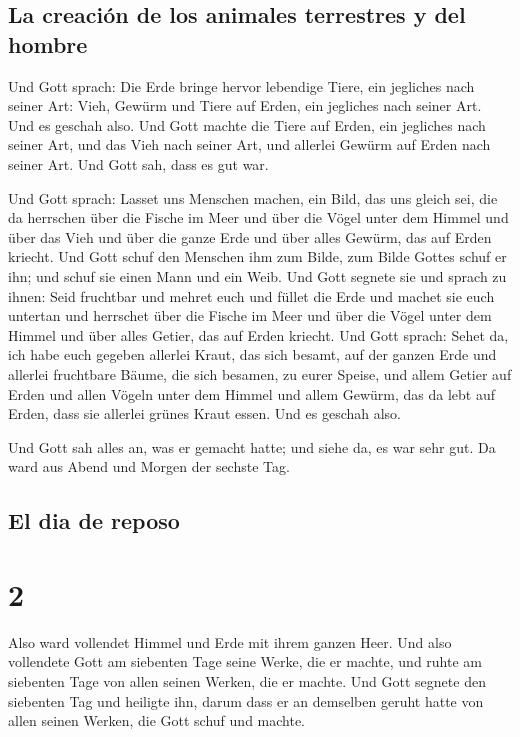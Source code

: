 \hypertarget{la-creaciuxf3n-de-los-animales-terrestres-y-del-hombre}{%
\subsection{La creación de los animales terrestres y del
hombre}\label{la-creaciuxf3n-de-los-animales-terrestres-y-del-hombre}}

 Und Gott sprach: Die Erde bringe hervor lebendige Tiere,
ein jegliches nach seiner Art: Vieh, Gewürm und Tiere auf Erden, ein
jegliches nach seiner Art. Und es geschah also.  Und Gott
machte die Tiere auf Erden, ein jegliches nach seiner Art, und das Vieh
nach seiner Art, und allerlei Gewürm auf Erden nach seiner Art. Und Gott
sah, dass es gut war.

 Und Gott sprach: Lasset uns Menschen machen, ein Bild,
das uns gleich sei, die da herrschen über die Fische im Meer und über
die Vögel unter dem Himmel und über das Vieh und über die ganze Erde und
über alles Gewürm, das auf Erden kriecht.  Und Gott schuf
den Menschen ihm zum Bilde, zum Bilde Gottes schuf er ihn; und schuf sie
einen Mann und ein Weib.  Und Gott segnete sie und sprach
zu ihnen: Seid fruchtbar und mehret euch und füllet die Erde und machet
sie euch untertan und herrschet über die Fische im Meer und über die
Vögel unter dem Himmel und über alles Getier, das auf Erden kriecht.
 Und Gott sprach: Sehet da, ich habe euch gegeben
allerlei Kraut, das sich besamt, auf der ganzen Erde und allerlei
fruchtbare Bäume, die sich besamen, zu eurer Speise,  und
allem Getier auf Erden und allen Vögeln unter dem Himmel und allem
Gewürm, das da lebt auf Erden, dass sie allerlei grünes Kraut essen. Und
es geschah also.

 Und Gott sah alles an, was er gemacht hatte; und siehe
da, es war sehr gut. Da ward aus Abend und Morgen der sechste Tag.

\hypertarget{el-dia-de-reposo}{%
\subsection{El dia de reposo}\label{el-dia-de-reposo}}

\hypertarget{section-1}{%
\section{2}\label{section-1}}

 Also ward vollendet Himmel und Erde mit ihrem ganzen
Heer.  Und also vollendete Gott am siebenten Tage seine
Werke, die er machte, und ruhte am siebenten Tage von allen seinen
Werken, die er machte.  Und Gott segnete den siebenten Tag
und heiligte ihn, darum dass er an demselben geruht hatte von allen
seinen Werken, die Gott schuf und machte.

